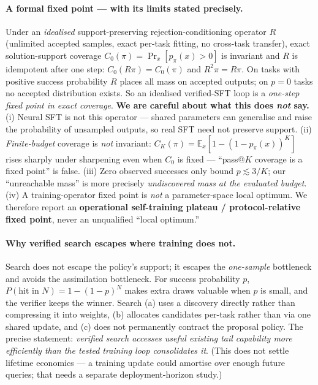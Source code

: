 \paragraph{A formal fixed point --- with its limits stated precisely.}
Under an \emph{idealised} support-preserving rejection-conditioning operator $R$ (unlimited accepted samples,
exact per-task fitting, no cross-task transfer), exact solution-support coverage
$C_0(\pi)=\Pr_x[p_\pi(x)>0]$ is invariant and $R$ is idempotent after one step: $C_0(R\pi)=C_0(\pi)$ and
$R^2\pi=R\pi$. On tasks with positive success probability $R$ places all mass on accepted outputs; on $p{=}0$
tasks no accepted distribution exists. So an idealised verified-SFT loop is a \emph{one-step fixed point in
exact coverage}. \textbf{We are careful about what this does \emph{not} say.} (i) Neural SFT is not this
operator --- shared parameters can generalise and raise the probability of unsampled outputs, so real SFT need
not preserve support. (ii) \emph{Finite-budget} coverage is \emph{not} invariant:
$C_K(\pi)=\mathbb{E}_x[1-(1-p_\pi(x))^K]$ rises sharply under sharpening even when $C_0$ is fixed --- ``pass@$K$
coverage is a fixed point'' is false. (iii) Zero observed successes only bound $p\lesssim 3/K$; our
``unreachable mass'' is more precisely \emph{undiscovered mass at the evaluated budget}. (iv) A training-operator
fixed point is \emph{not} a parameter-space local optimum. We therefore report an \textbf{operational
self-training plateau / protocol-relative fixed point}, never an unqualified ``local optimum.''

\paragraph{Why verified search escapes where training does not.}
Search does not escape the policy's support; it escapes the \emph{one-sample} bottleneck and avoids the
assimilation bottleneck. For success probability $p$, $P(\text{hit in }N)=1-(1-p)^N$ makes extra draws
valuable when $p$ is small, and the verifier keeps the winner. Search (a) uses a discovery directly rather than
compressing it into weights, (b) allocates candidates per-task rather than via one shared update, and (c) does
not permanently contract the proposal policy. The precise statement: \emph{verified search accesses useful
existing tail capability more efficiently than the tested training loop consolidates it}. (This does not settle
lifetime economics --- a training update could amortise over enough future queries; that needs a separate
deployment-horizon study.)

